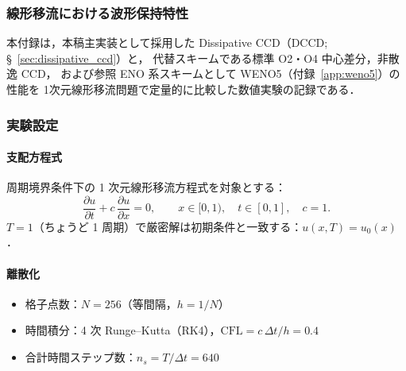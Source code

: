%
%

\subsubsection{線形移流における波形保持特性}
\label{app:dccd_comparison}

本付録は，本稿主実装として採用した Dissipative CCD（DCCD; §~\ref{sec:dissipative_ccd}）と，
代替スキームである標準 O2・O4 中心差分，非散逸 CCD，
および参照 ENO 系スキームとして WENO5（付録~\ref{app:weno5}）の性能を
1次元線形移流問題で定量的に比較した数値実験の記録である．

\subsubsection{実験設定}
\label{app:dccd_setup}

\paragraph{支配方程式}
周期境界条件下の 1 次元線形移流方程式を対象とする：
\begin{equation}
  \frac{\partial u}{\partial t} + c\,\frac{\partial u}{\partial x} = 0,
  \qquad x \in [0,1),\quad t \in [0,1],\quad c = 1.
  \label{eq:dccd_advection}
\end{equation}
$T = 1$（ちょうど 1 周期）で厳密解は初期条件と一致する：$u(x,T) = u_0(x)$．

\paragraph{離散化}
\begin{itemize}
  \item 格子点数：$N = 256$（等間隔，$h = 1/N$）
  \item 時間積分：4 次 Runge--Kutta（RK4），$\mathrm{CFL} = c\,\Delta t / h = 0.4$
  \item 合計時間ステップ数：$n_s = T / \Delta t = 640$
\end{itemize}

